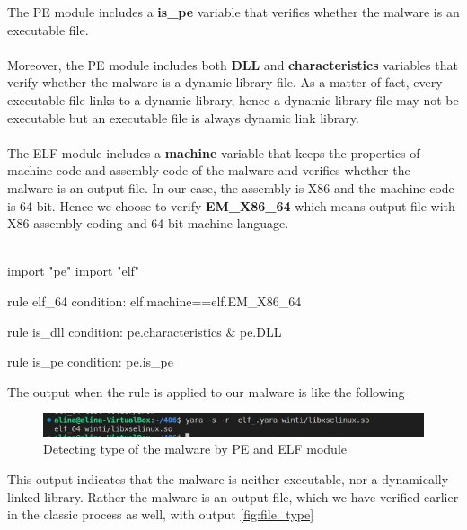 The PE module includes a \textbf{is\_pe} variable that verifies whether the malware is an executable file. 
\\
\\
Moreover, the PE module includes both \textbf{DLL} and \textbf{characteristics} variables that verify whether the malware is a dynamic library file. As a matter of fact, every executable file links to a dynamic library, hence a dynamic library file may not be executable but an executable file is always dynamic link library.
\\
\\
The ELF module includes a \textbf{machine} variable that keeps the properties of machine code and assembly code of the malware and verifies whether the malware is an output file. In our case, the assembly is X86 and the machine code is 64-bit. Hence we choose to verify \textbf{EM\_X86\_64} which means output file with X86 assembly coding and 64-bit machine language.
\\
\\

\begin{yaracode}


import "pe"
import "elf"


rule elf_64
{
    condition:
        elf.machine==elf.EM_X86_64
}

rule is_dll
{
    condition:
        pe.characteristics & pe.DLL
}

rule is_pe
{
    condition:
        pe.is_pe
}


\end{yaracode}
The output when the rule is applied to our malware is like the following
\\

\begin{figure}[H]

    \centering
    \includegraphics[width=\textwidth]{pe_elf.jpg}
    \caption{Detecting type of the malware by PE and ELF module}
    \label{fig:file_pe_elf}
    
\end{figure}
This output indicates that the malware is neither executable, nor a dynamically linked library. Rather the malware is an output file, which we have verified earlier in the classic process as well, with output \ref{fig:file_type}
\\